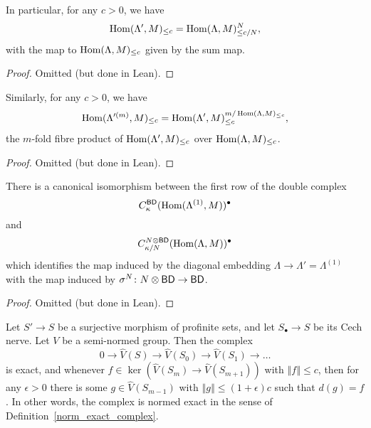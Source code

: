 \begin{lemma}
  \label{canonical_iso_1}
  \leanok
  In particular, for any $c>0$, we have
  \[
    \operatorname{Hom}(\Lambda',M)_{\leq c} = \operatorname{Hom}(\Lambda,M)_{\leq c/N}^N,
  \]
  with the map to $\operatorname{Hom}(\Lambda,M)_{\leq c}$ given by the sum map.
\end{lemma}

\begin{proof}
  \leanok
  Omitted (but done in Lean).
\end{proof}

\begin{lemma}
  \label{canonical_iso_2}
  \leanok
  Similarly, for any $c>0$, we have
  \[
    \operatorname{Hom}(\Lambda'^{(m)},M)_{\leq c} =
    \operatorname{Hom}(\Lambda',M)_{\leq c}^{m/\operatorname{Hom}(\Lambda,M)_{\leq c}},
  \]
  the $m$-fold fibre product of $\operatorname{Hom}(\Lambda',M)_{\leq c}$
  over $\operatorname{Hom}(\Lambda,M)_{\leq c}$.
\end{lemma}

\begin{proof}
  \leanok
  Omitted (but done in Lean).
\end{proof}

\begin{lemma}
  \label{row_one_iso}
  \leanok
  There is a canonical isomorphism between the first row of the double complex
  \[
    C^{\mathsf{BD}}_{\kappa}(\operatorname{Hom}(\Lambda^{(1)}, M))^\bullet
  \]
  and
  \[
    C^{N \otimes \mathsf{BD}}_{\kappa/N}(\operatorname{Hom}(\Lambda, M))^\bullet
  \]
  which identifies the map induced by
  the diagonal embedding $\Lambda \to \Lambda' = \Lambda^{(1)}$
  with the map induced by $\sigma^N \colon N \otimes \mathsf{BD} \to \mathsf{BD}$.
\end{lemma}

\begin{proof}
  \leanok
  Omitted (but done in Lean).
\end{proof}

\begin{proposition}
  \label{cechcover-exact}
  \leanok
  Let $S' \to S$ be a surjective morphism of profinite sets,
  and let $S_\bullet\to S$ be its Cech nerve.
  Let $V$ be a semi-normed group.
  Then the complex
  \[
    0\to \widehat{V}(S)\to \widehat{V}(S_0)\to \widehat{V}(S_1)\to \ldots
  \]
  is exact,
  and whenever $f\in \ker(\widehat{V}(S_m)\to \widehat{V}(S_{m+1}))$ with $‖f‖\leq c$,
  then for any $\epsilon>0$ there is some $g\in \widehat{V}(S_{m-1})$ with $‖g‖\leq (1+\epsilon)c$ such that $d(g)=f$.
  In other words, the complex is normed exact in the sense of Definition~\ref{norm_exact_complex}.
\end{proposition}

